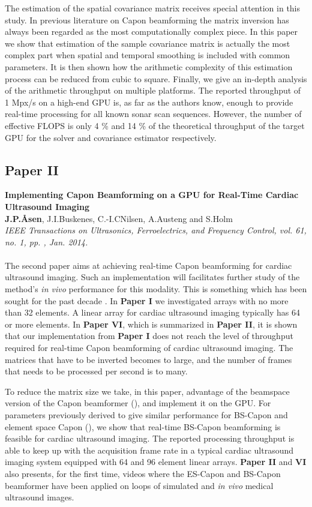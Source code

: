 The estimation of the spatial covariance matrix receives special attention in this study. In previous literature on Capon beamforming the matrix inversion has always been regarded as the most computationally complex piece. In this paper we show that estimation of the sample covariance matrix is actually the most complex part when spatial and temporal smoothing is included with common parameters. It is then shown how the arithmetic complexity of this estimation process can be reduced from cubic to square. Finally, we give an in-depth analysis of the arithmetic throughput on multiple platforms. The reported throughput of 1 Mpx/s on a high-end GPU is, as far as the authors know, enough to provide real-time processing for all known sonar scan sequences. However, the number of effective FLOPS is only 4 \% and 14 \% of the theoretical throughput of the target GPU for the solver and covariance estimator respectively.

\subsection{Paper II}
\textbf{Implementing Capon Beamforming on a GPU for Real-Time Cardiac Ultrasound Imaging}\\
\textbf{J.\:P.\:\AA{}sen}, J.\:I.\:Buskenes, C.-I.\:C\:Nilsen, A.\:Austeng and S.\:Holm\\
{\it IEEE Transactions on Ultrasonics, Ferroelectrics, and Frequency Control, vol. 61, no. 1, pp. , Jan. 2014.}\\\\
The second paper aims at achieving real-time Capon beamforming for cardiac ultrasound imaging. Such an implementation will facilitates further study of the method's \textit{in vivo} performance for this modality. This is something which has been sought for the past decade . In \textbf{Paper I} we investigated arrays with no more than 32 elements. A linear array for cardiac ultrasound imaging typically has 64 or more elements. In \textbf{Paper VI}, which is summarized in \textbf{Paper II}, it is shown that our implementation from  \textbf{Paper I} does not reach the level of throughput required for real-time Capon beamforming of cardiac ultrasound imaging. The matrices that have to be inverted becomes to large, and the number of frames that needs to be processed per second is to many.

To reduce the matrix size we take, in this paper, advantage of the beamspace version of the Capon beamformer (), and implement it on the GPU. For parameters previously derived to give similar performance for BS-Capon and element space Capon (), we show that real-time BS-Capon beamforming is feasible for cardiac ultrasound imaging. The reported processing throughput is able to keep up with the acquisition frame rate in a typical cardiac ultrasound imaging system equipped with 64 and 96 element linear arrays.  \textbf{Paper II} and \textbf{VI} also presents, for the first time, videos where the ES-Capon and BS-Capon beamformer have been applied on loops of simulated and \textit{in vivo} medical ultrasound images.

